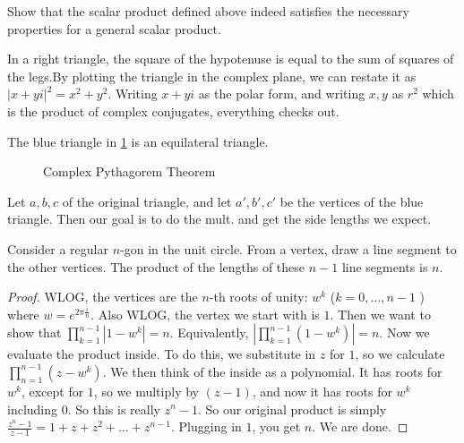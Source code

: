 \documentclass{memoir}
\begin{document}
\begin{hw}
	Show that the scalar product defined above indeed satisfies the necessary properties for a general scalar product.
\end{hw}


\begin{thm}
	In a right triangle, the square of the hypotenuse is equal to the sum of squares of the legs.By plotting the triangle in the complex plane, we can restate it as \(\left| x+yi \right|^2 = x^2+y^2\). Writing \(x+yi\) as the polar form, and writing \(x,y\) as \(r^2\) which is the product of complex conjugates, everything checks out.
\end{thm}
\begin{thm}[]
	The blue triangle in \ref{fig:triangles} is an equilateral triangle.	
\end{thm}

\begin{figure}[ht]
    \centering
     \def\svgwidth{1\linewidth}
     
    \caption{Complex Pythagorem Theorem}
    \label{fig:triangles}
\end{figure}

Let \(a,b,c\) of the original triangle, and let \(a',b',c'\) be the vertices of the blue triangle. Then our goal is to do the mult. and get the side lengths we expect.
\begin{thm}
	Consider a regular \(n\)-gon in the unit circle. From a vertex, draw a line segment to the other vertices. The product of the lengths of these \(n-1\) line segments is \(n\).
\end{thm}
\begin{proof}
WLOG, the vertices are the \(n\)-th roots of unity: \(w^{k}\) (\(k = 0,\ldots,n-1\) ) where \(w = e^{2\pi \frac{i}{n}}\). Also WLOG, the vertex we start with is \(1\). Then we want to show that \(\prod_{k=1}^{n-1} |1-w^{k}| = n \). Equivalently, \(\left| \prod_{k=1}^{n-1} (1-w^{k})  \right| = n\). Now we evaluate the product inside. To do this, we substitute in \(z\) for \(1\), so we calculate \(\prod_{n=1}^{n-1} (z-w^{k}) \). We then think of the inside as a polynomial. It has roots for \(w^{k}\), except for \(1\), so we multiply by \((z-1)\), and now it has roots for \(w^{k}\) including 0. So this is really \(z^{n}-1\). So our original product is simply \(\frac{z^{n}-1}{z-1} = 1 + z + z^2 + \ldots + z^{n-1}\). Plugging in \(1\), you get \(n\). We are done.
\end{proof}
\end{document}
